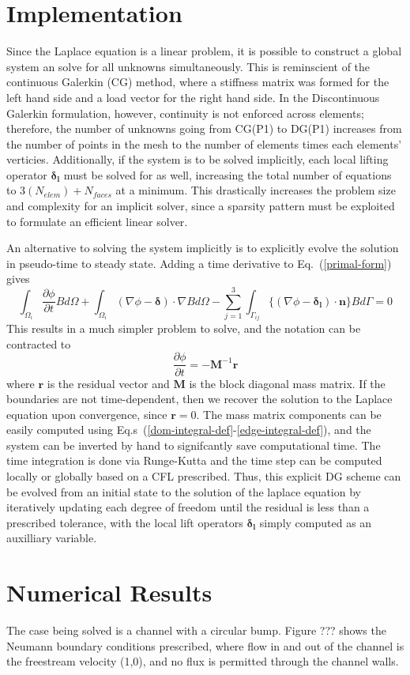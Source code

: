 \documentclass[a4paper]{report}
\newcommand{\eref}[1]{Eq.~(\ref{#1})}
\newcommand{\erefs}[2]{Eq.s~(\ref{#1}-\ref{#2})}
\newcommand{\dint}[1]{\int_{\Omega_i}{#1 d\Omega}}
\newcommand{\sint}[1]{\int_{\Gamma_{ij}}{#1 d\Gamma}}
\newcommand{\average}[1]{\ensuremath{\{#1\}} }
\newcommand{\glift}{\boldsymbol{\delta}}
\newcommand{\llift}{\boldsymbol{\delta_l}}
\newcommand{\unitn}{\mathbf{n}}
\newcommand{\mm}{\mathbf{M}}
\newcommand{\vr}{\mathbf{r}}
\begin{document}
\section{Implementation}
Since the Laplace equation is a linear problem, it is possible to construct a
global system an solve for all unknowns simultaneously.  This is reminscient of
the continuous Galerkin (CG) method, where a stiffness matrix was formed for the left
hand side and a load vector for the right hand side.  In the Discontinuous Galerkin
formulation, however, continuity is not enforced across elements; therefore, the
number of unknowns going from CG(P1) to DG(P1) increases from the number of
points in the mesh to the number of elements times each elements' verticies.
Additionally, if the system is to be solved implicitly, each local lifting
operator $\llift$ must be solved for as well, increasing the total number of
equations to $3(N_{elem})+N_{faces}$ at a minimum.  This drastically increases
the problem size and complexity for an implicit solver, since a sparsity pattern
must be exploited to formulate an efficient linear solver.

An alternative to solving the system implicitly is to explicitly evolve the
solution in pseudo-time to steady state.  Adding a time derivative to
\eref{primal-form} gives
\begin{equation}
  \dint{\frac{\partial \phi}{\partial t}B} +
  \dint{(\nabla \phi - \glift)\cdot \nabla B} -
  \sum_{j=1}^3\sint{\average{(\nabla \phi - \llift)\cdot\unitn}B} = 0
  \label{primal-w-time}
\end{equation}
This results in a much simpler problem to solve, and the notation can be
contracted to
\begin{equation}
  \frac{\partial \phi}{\partial t} = -\mm^{-1} \vr
  \label{simple-explicit}
\end{equation}
where $\vr$ is the residual vector and $\mm$ is the block diagonal mass matrix.
If the boundaries are not time-dependent, then we recover the solution to the
Laplace equation upon convergence, since $\vr= 0$.  The mass matrix components can be
easily computed using \erefs{dom-integral-def}{edge-integral-def}, and the
system can be inverted by hand to signifcantly save computational time. The time
integration is done via Runge-Kutta and the time step can be computed locally or
globally based on a CFL prescribed.  Thus, this explicit DG scheme can be
evolved from an initial state to the solution of the laplace equation by
iteratively updating each degree of freedom until the residual is less than a
prescribed tolerance, with the local lift operators $\llift$ simply computed as
an auxilliary variable.

\section{Numerical Results}
The case being solved is a channel with a circular bump.  Figure ??? shows 
the Neumann boundary conditions prescribed, where flow in and out of the
channel is the freestream velocity (1,0), and no flux is permitted through the
channel walls.

\end{document}
